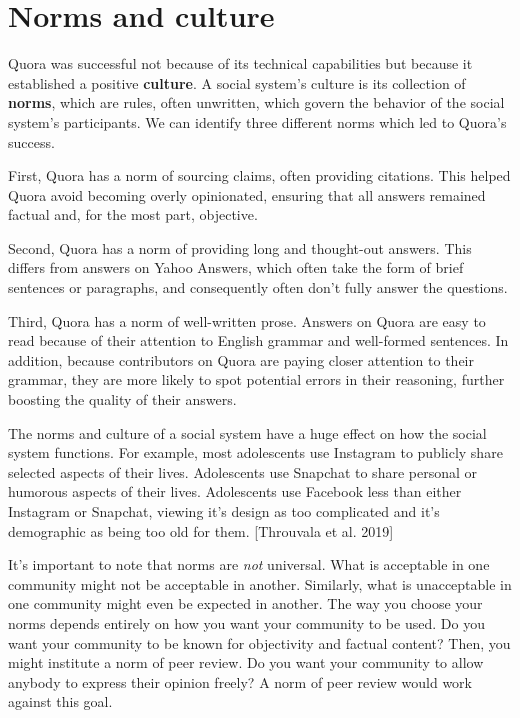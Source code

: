 \documentclass[class=book, crop=false]{standalone}
\providecommand{\keyterm}[1]{\textbf{#1}\marginnote{\scriptsize \textbf{#1}}}
\begin{document}
\section{Norms and culture}

Quora was successful not because of its technical capabilities but because it established a positive \keyterm{culture}. A social system's culture is its collection of \keyterm{norms}, which are rules, often unwritten, which govern the behavior of the social system's participants. We can identify three different norms which led to Quora's success.

First, Quora has a norm of sourcing claims, often providing citations. This helped Quora avoid becoming overly opinionated, ensuring that all answers remained factual and, for the most part, objective.

Second, Quora has a norm of providing long and thought-out answers. This differs from answers on Yahoo Answers, which often take the form of brief sentences or paragraphs, and consequently often don't fully answer the questions.

Third, Quora has a norm of well-written prose. Answers on Quora are easy to read because of their attention to English grammar and well-formed sentences. In addition, because contributors on Quora are paying closer attention to their grammar, they are more likely to spot potential errors in their reasoning, further boosting the quality of their answers.

The norms and culture of a social system have a huge effect on how the social system functions. For example, most adolescents use Instagram to publicly share selected aspects of their lives. Adolescents use Snapchat to share personal or humorous aspects of their lives. Adolescents use Facebook less than either Instagram or Snapchat, viewing it's design as too complicated and it's demographic as being too old for them. [Throuvala et al. 2019]

It's important to note that norms are \textit{not} universal. What is acceptable in one community might not be acceptable in another. Similarly, what is unacceptable in one community might even be expected in another. The way you choose your norms depends entirely on how you want your community to be used. Do you want your community to be known for objectivity and factual content? Then, you might institute a norm of peer review. Do you want your community to allow anybody to express their opinion freely? A norm of peer review would work against this goal.
\end{document}
